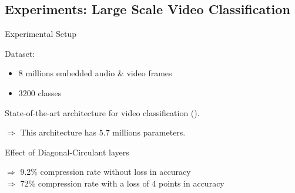 \subsection{Experiments: Large Scale Video Classification}



\begin{frame}{Experimental Setup}

  \begin{block}{Dataset: \yt}
  \begin{itemize}
    \item 8 millions embedded audio \& video frames
    \item 3200 classes
  \end{itemize}
  \end{block}
  State-of-the-art architecture for video classification (\cite{miech2017youtube}).
  \begin{figure}[htb]
    \scalebox{0.65}{}
  \end{figure}
  $\Rightarrow$ This architecture has $5.7$ millions parameters.

\end{frame}


\begin{frame}{Effect of Diagonal-Circulant layers}

  \begin{figure}[!htb]
    \centering
    \scalebox{0.8}{}
  \end{figure}
  $\Rightarrow$ 9.2\% compression rate without loss in accuracy \\	
  $\Rightarrow$ 72\% compression rate with a loss of 4 points in accuracy
\end{frame}

